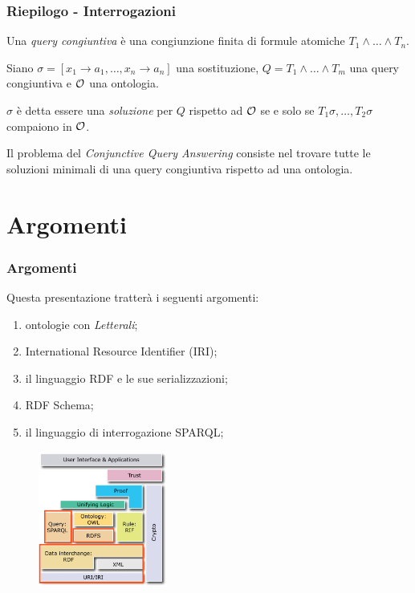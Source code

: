 \documentclass[8pt]{beamer}
\begin{document}
\begin{frame}
\frametitle{Riepilogo - Interrogazioni}
Una \emph{query congiuntiva} \`e una congiunzione finita di formule atomiche $T_1 \wedge \ldots \wedge T_n$.
\vspace{\baselineskip}

Siano $\sigma=[x_1 \rightarrow a_1, \ldots, x_n \rightarrow a_n]$ una sostituzione,
$Q=T_1 \wedge \ldots \wedge T_m$ una query congiuntiva e $\mathcal{O}$ una ontologia.
\vspace{\baselineskip}

$\sigma$ \`e detta essere una \emph{soluzione} per $Q$ rispetto ad $\mathcal{O}$ se
e solo se $T_1\sigma, \ldots, T_2\sigma$ compaiono in $\mathcal{O}$. 
\vspace{\baselineskip}

Il problema del \emph{Conjunctive Query Answering} consiste nel trovare
tutte le soluzioni minimali di una query congiuntiva rispetto ad una ontologia.
\end{frame}

\section{Argomenti}

\begin{frame}
\frametitle{Argomenti}
Questa presentazione tratter\`a i seguenti argomenti:
\begin{enumerate}
 \item ontologie con \emph{Letterali};
 \item International Resource Identifier (IRI);
 \item il linguaggio RDF e le sue serializzazioni;
 \item RDF Schema;
 \item il linguaggio di interrogazione SPARQL;
\end{enumerate}

\begin{figure}
 \includegraphics[width=160px]{Semantic_Web_Stack_rect.png} 
\end{figure}
\end{frame}
\end{document}
